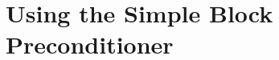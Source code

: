 \section{Using the Simple Block Preconditioner\label{sec:using_the_simple_block_preconditioner}}
%
%
%
%
%
%
